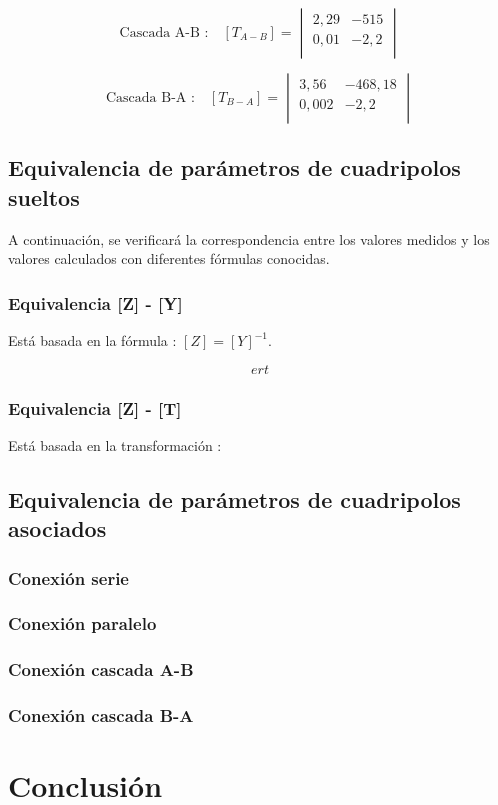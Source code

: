 \documentclass[a4paper]{article}
\begin{document}
\begin{equation}
\text{Cascada A-B :}\quad [T_{A-B}] =
\begin{vmatrix}
	2,29 & -515\\
	0,01 & -2,2\\
\end{vmatrix}
\end{equation}

\begin{equation}
\text{Cascada B-A :}\quad [T_{B-A}] =
\begin{vmatrix}
	3,56 & -468,18\\
	0,002 & -2,2\\
\end{vmatrix}
\end{equation}

\subsection*{Equivalencia de parámetros de cuadripolos sueltos}

A continuación, se verificará la correspondencia entre los valores medidos y los valores calculados con diferentes fórmulas conocidas.

\subsubsection*{Equivalencia [Z] - [Y]}

Está basada en la fórmula : $[Z]=[Y]^{-1}$.

\begin{equation}
ert
\end{equation}

\subsubsection*{Equivalencia [Z] - [T]}

Está basada en la transformación : 

\subsection*{Equivalencia de parámetros de cuadripolos asociados}

\subsubsection*{Conexión serie}

\subsubsection*{Conexión paralelo}

\subsubsection*{Conexión cascada A-B}

\subsubsection*{Conexión cascada B-A}

\section*{Conclusión}
\end{document}

